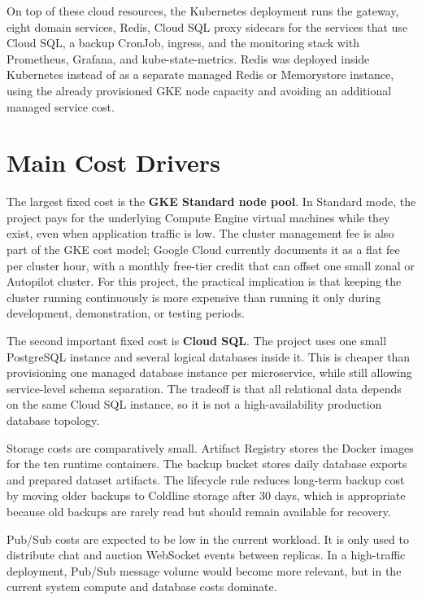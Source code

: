 On top of these cloud resources, the Kubernetes deployment runs the gateway, eight domain services, Redis, Cloud SQL proxy sidecars for the services that use Cloud SQL, a backup CronJob, ingress, and the monitoring stack with Prometheus, Grafana, and kube-state-metrics. Redis was deployed inside Kubernetes instead of as a separate managed Redis or Memorystore instance, using the already provisioned GKE node capacity and avoiding an additional managed service cost.

\section{Main Cost Drivers}

The largest fixed cost is the \textbf{GKE Standard node pool}. In Standard mode, the project pays for the underlying Compute Engine virtual machines while they exist, even when application traffic is low. The cluster management fee is also part of the GKE cost model; Google Cloud currently documents it as a flat fee per cluster hour, with a monthly free-tier credit that can offset one small zonal or Autopilot cluster. For this project, the practical implication is that keeping the cluster running continuously is more expensive than running it only during development, demonstration, or testing periods.

The second important fixed cost is \textbf{Cloud SQL}. The project uses one small PostgreSQL instance and several logical databases inside it. This is cheaper than provisioning one managed database instance per microservice, while still allowing service-level schema separation. The tradeoff is that all relational data depends on the same Cloud SQL instance, so it is not a high-availability production database topology.

Storage costs are comparatively small. Artifact Registry stores the Docker images for the ten runtime containers. The backup bucket stores daily database exports and prepared dataset artifacts. The lifecycle rule reduces long-term backup cost by moving older backups to Coldline storage after 30 days, which is appropriate because old backups are rarely read but should remain available for recovery.

Pub/Sub costs are expected to be low in the current workload. It is only used to distribute chat and auction WebSocket events between replicas. In a high-traffic deployment, Pub/Sub message volume would become more relevant, but in the current system compute and database costs dominate.

